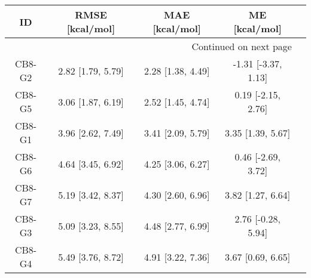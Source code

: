 \documentclass[8pt]{article}
\begin{document}
\begin{center}
\begin{footnotesize}
\begin{longtable}{|ccccc|}
\toprule
     ID &    RMSE [kcal/mol] &     MAE [kcal/mol] &        ME [kcal/mol] \\
\midrule
\endhead
\midrule
\multicolumn{4}{r}{{Continued on next page}} \\
\midrule
\endfoot

\bottomrule
\endlastfoot
 CB8-G2 &  2.82 [1.79, 5.79] &  2.28 [1.38, 4.49] &  -1.31 [-3.37, 1.13] \\
 CB8-G5 &  3.06 [1.87, 6.19] &  2.52 [1.45, 4.74] &   0.19 [-2.15, 2.76] \\
 CB8-G1 &  3.96 [2.62, 7.49] &  3.41 [2.09, 5.79] &    3.35 [1.39, 5.67] \\
 CB8-G6 &  4.64 [3.45, 6.92] &  4.25 [3.06, 6.27] &   0.46 [-2.69, 3.72] \\
 CB8-G7 &  5.19 [3.42, 8.37] &  4.30 [2.60, 6.96] &    3.82 [1.27, 6.64] \\
 CB8-G3 &  5.09 [3.23, 8.55] &  4.48 [2.77, 6.99] &   2.76 [-0.28, 5.94] \\
 CB8-G4 &  5.49 [3.76, 8.72] &  4.91 [3.22, 7.36] &    3.67 [0.69, 6.65] \\
\end{longtable}
\end{footnotesize}
\end{center}
\end{document}
